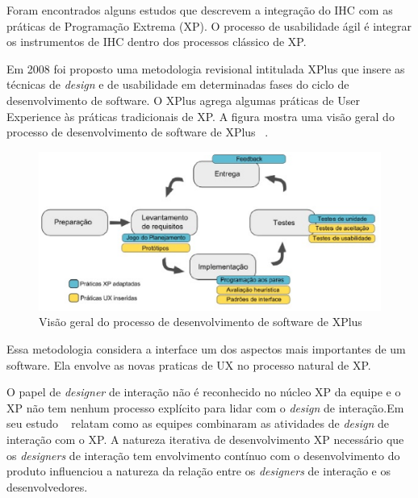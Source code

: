 Foram encontrados alguns estudos que descrevem a integração do IHC com as práticas de Programação Extrema (XP). O processo de usabilidade ágil é integrar os instrumentos de IHC dentro dos processos clássico de XP. 

%
Em 2008 foi proposto uma metodologia revisional intitulada XPlus que insere as técnicas de \emph{design} e de usabilidade em determinadas fases do ciclo de desenvolvimento de software. O XPlus agrega algumas práticas de User Experience às práticas tradicionais de XP. A figura mostra uma visão geral do processo de desenvolvimento de software de XPlus ~\cite{guimaraesxplus}.

\begin{figure}[h]
    \centering
    \includegraphics[keepaspectratio=true,scale=0.60]
      {figuras/xplus.eps}
    \caption{Visão geral do processo de desenvolvimento de software de XPlus}
    \label{ciclo_xplus}
\end{figure}

Essa metodologia considera a interface um dos aspectos mais importantes de um software. Ela envolve as novas praticas de UX no processo natural de XP.

O papel de \emph{designer} de interação não é reconhecido no núcleo XP da equipe e o XP não tem nenhum processo explícito para lidar com o \emph{design} de interação.Em seu estudo ~ relatam como as equipes combinaram as atividades de \emph{design} de interação com o XP. 
%
A natureza iterativa de desenvolvimento XP necessário que os \emph{designers} de interação tem envolvimento contínuo com o desenvolvimento do produto influenciou a natureza da relação entre os \emph{designers} de interação e os desenvolvedores.
%

